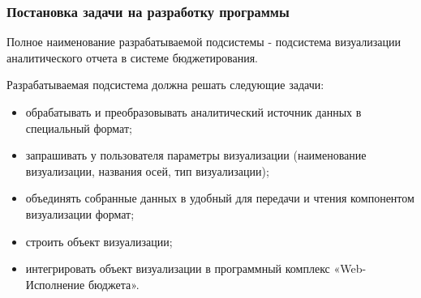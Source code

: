 \documentclass[a4paper]{extarticle}
\begin{document}
\subsubsection{Постановка задачи на разработку программы}
Полное наименование разрабатываемой подсистемы - подсистема визуализации аналитического отчета в системе бюджетирования.\par
Разрабатываемая подсистема должна решать следующие задачи:
\begin{itemize}
  \item обрабатывать и преобразовывать аналитический источник данных в специальный формат;
  \item запрашивать у пользователя параметры визуализации (наименование визуализации, названия осей, тип визуализации);
  \item объединять собранные данных в удобный для передачи и чтения компонентом визуализации формат;
  \item строить объект визуализации;
  \item интегрировать объект визуализации в программный комплекс «Web-Исполнение бюджета».
\end{itemize}\par
\end{document}
